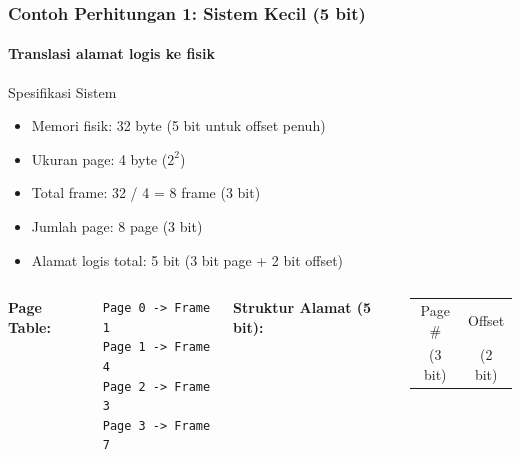 \documentclass[t,aspectratio=169,xcolor=dvipsnames]{beamer}
\begin{document}
\begin{frame}[fragile]
    \frametitle{Contoh Perhitungan 1: Sistem Kecil (5 bit)}
    \framesubtitle{Translasi alamat logis ke fisik}
    \small

    \begin{block}{Spesifikasi Sistem}
        \scriptsize
        \begin{itemize}
            \item Memori fisik: 32 byte (5 bit untuk offset penuh)
            \item Ukuran page: 4 byte ($2^2$)
            \item Total frame: 32 / 4 = 8 frame (3 bit)
            \item Jumlah page: 8 page (3 bit)
            \item Alamat logis total: 5 bit (3 bit page + 2 bit offset)
        \end{itemize}
    \end{block}

    \vspace{0.01cm}
    \begin{columns}[T]
        \textbf{Page Table:}
        \begin{footnotesize}
        \begin{verbatim}
Page 0 -> Frame 1
Page 1 -> Frame 4
Page 2 -> Frame 3
Page 3 -> Frame 7
        \end{verbatim}
        \end{footnotesize}

        \textbf{Struktur Alamat (5 bit):}
        \begin{center}
            \begin{tabular}{|c|c|}
                \hline
                Page \# & Offset \\
                (3 bit) & (2 bit) \\
                \hline
            \end{tabular}
        \end{center}
    \end{columns}
\end{frame}
\end{document}
